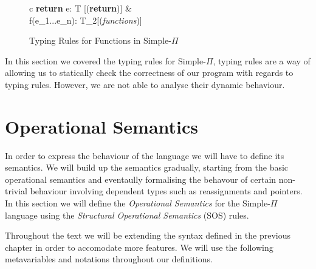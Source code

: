 \documentclass[a4paper,12pt]{report}
\begin{document}
\begin{figure}[H]
  \begin{center}
    \begin{tabular} {c}
        {\Gamma \vdash \textbf{return } e: T} [(\textbf{return})] \text{ }
      & \\
        {\Gamma \vdash f(e_1...e_n): T_2}[(\textit{functions})]
    \end{tabular}
  \end{center}
  \caption{Typing Rules for Functions in Simple-$\Pi$}
\end{figure}


\par
In this section we covered the typing rules for Simple-$\Pi$, typing rules are a 
way of allowing us to statically check the correctness of our program with 
regards to typing rules. However, we are not able to analyse their dynamic 
behaviour. 

\section{Operational Semantics}
In order to express the behaviour of the language we will have to define its semantics. 
We will build up the semantics gradually, starting from the basic 
operational semantics and eventaully formalising the behavour of certain 
non-trivial behaviour involving dependent types such as reassignments and 
pointers. In this section we will define the \textit{Operational Semantics} 
\cite{operationalSemantics} for the Simple-$\Pi$ language 
using the \textit{Structural Operational Semantics} \cite{plotkinSOS} (SOS) rules.

\par
Throughout the text we will be extending the syntax defined in the 
previous chapter in order to accomodate more features. 
We will use the following metavariables and notations throughout our 
definitions.
\end{document}

